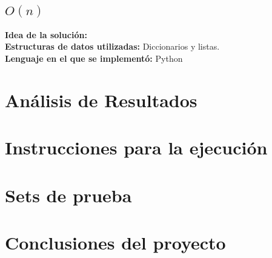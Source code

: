\documentclass{article}
\begin{document}
		\subsection{$O(n)$}
			\textbf{Idea de la solución:}\\	
			\textbf{Estructuras de datos utilizadas:} Diccionarios y listas.\\
			\textbf{Lenguaje en el que se implementó:} Python
	\section{Análisis de Resultados}

	\section{Instrucciones para la ejecución}

	\section{Sets de prueba}

	\section{Conclusiones del proyecto}
\end{document}
